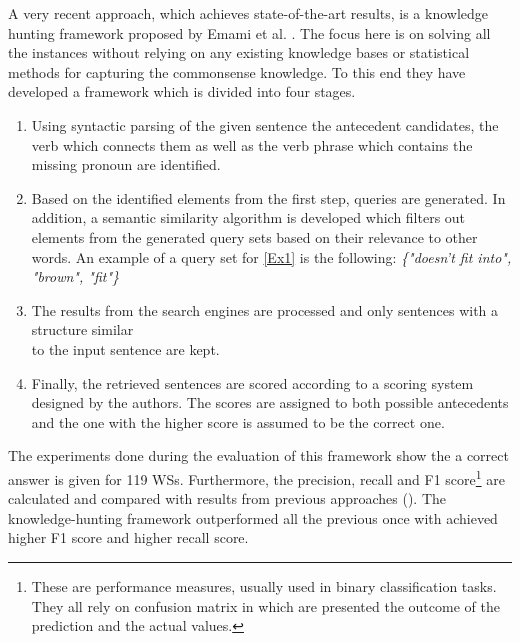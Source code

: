   
A very recent approach, which achieves state-of-the-art results, is a knowledge hunting framework proposed by Emami et al. \cite{DBLP:conf/emnlp/EmamiCTSC18}. The focus here is on solving all the instances without relying on any existing knowledge bases or statistical methods for capturing the commonsense knowledge. To this end they have developed a framework which is divided into four stages.
\begin{enumerate}
	\item Using syntactic parsing of the given sentence the antecedent candidates, the verb which connects them as well as the verb phrase which contains the missing pronoun are identified.
	\item Based on the identified elements from the first step, queries are generated. In addition, a semantic similarity algorithm is developed which filters out elements from the generated query sets based on their relevance to other words.
	An example of a query set for \ref{Ex1} is the following: \textit{\{"doesn't fit into", "brown", "fit"\}}
	\item The results from the search engines are processed and only sentences with a structure similar \\to the input sentence are kept.
	\item Finally, the retrieved sentences are scored according to a scoring system designed by the authors. The scores are assigned to both possible antecedents and the one with the higher score is assumed to be the correct one.
\end{enumerate}

 The experiments done during the evaluation of this framework show the a correct answer is given for 119 WSs. Furthermore, the precision, recall and F1 score\footnote{These are performance measures, usually used in binary classification tasks. They all rely on confusion matrix in which are presented the outcome of the prediction and the actual values.} are calculated and compared with results from previous approaches (\cite{DBLP:conf/aaai/SharmaB16, DBLP:conf/aaaiss/LiuJLZWH17}). The knowledge-hunting framework outperformed all the previous once with achieved higher F1 score and higher recall score. 

